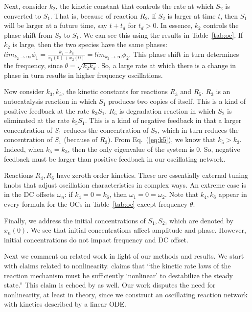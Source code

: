 \documentclass{bmcart}
\newcommand{\eqn}[1]{Eq.~(\ref{#1})}
\newcommand{\tab}[1]{Table~\ref{#1}}
\begin{document}
Next, consider $k_2$, the kinetic constant that controls the rate at which $S_2$ is converted to $S_1$. That is, because of reaction $R_2$, if $S_2$ is larger at time $t$, then $S_1$ will be larger at a future time, say $t + t_d$ for $t_d >0$. In essence, $k_2$ controls the phase shift from $S_2$ to $S_1$. We can see this using the results in \tab{tab:oc}. If $k_2$ is large, then the two species have the same phases:
$lim_{k_2 \rightarrow \infty} \phi_1 = \frac{k_4 -k_6}{x_1(0) + x_2(0)} = lim_{k_2 \rightarrow \infty} \phi_2$. This phase shift in turn determines the frequency, since $\theta = \sqrt{k_2 k_d}.$ So, a large rate at which there is a change in phase in turn results in higher frequency oscillations.

Now consider $k_3, k_5$, the kinetic constants for reactions $R_3$ and $R_5$. $R_3$ is an autocatalysis reaction in which $S_1$ produces two copies of itself. This is a kind of positive feedback at the rate $k_3 S_1$. $R_5$ is degradation reaction in which $S_2$ is eliminated at the rate $k_5 S_1$. This is a kind of negative feedback in that a larger concentration of $S_1$ reduces the concentration of $S_2$, which in turn reduces the concentration of $S_1$ (because of $R_2$). From \eqn{eq:k5}, we know that $k_5 > k_3$. Indeed, when $k_5 = k_3$, then the only eigenvalue of the system is 0. So, negative feedback must be larger than positive feedback in our oscillating network.

Reactions $R_4, R_6$ have zeroth order kinetics. These are essentially external tuning knobs that adjust oscillation characteristics in complex ways. An extreme case is in the DC offsets $\omega_n$: if $k_4 = 0 = k_6$, then $\omega_1 = 0 = \omega_2$. Note that $k_4, k_6$ appear in every formula for the OCs in \tab{tab:oc} except frequency $\theta$.

Finally, we address the initial concentrations of $S_1, S_2$, which are denoted by $x_n(0)$. We see that initial concentrations affect amplitude and phase. However, initial concentrations do not impact frequency and DC offset.

Next we comment on related work in light of our methods and results. We start with claims related to nonlinearity. \cite{gonze2021} claims that ``the kinetic rate laws of the reaction mechanism must be sufficiently ‘nonlinear’ to destabilize the steady state.” This claim is echoed by \cite{Novak2008} as well. Our work disputes the need for nonlinearity, at least in theory, since we construct an oscillating reaction network with kinetics described by a linear ODE.
\end{document}
